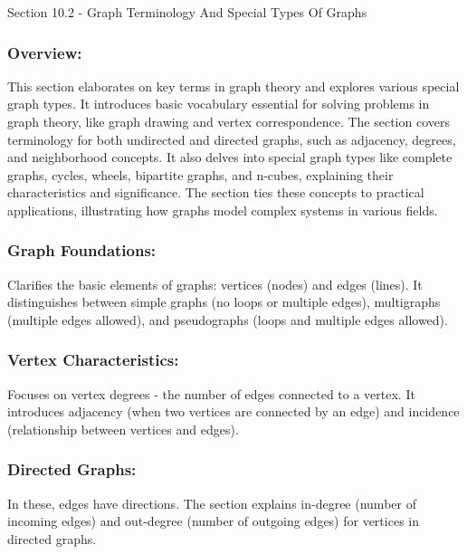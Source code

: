 \begin{notes}{Section 10.2 - Graph Terminology And Special Types Of Graphs}
    \subsubsection*{Overview:}

    This section elaborates on key terms in graph theory and explores various special graph types. It introduces basic vocabulary essential for solving problems in graph theory, like graph drawing and 
    vertex correspondence. The section covers terminology for both undirected and directed graphs, such as adjacency, degrees, and neighborhood concepts. It also delves into special graph types like 
    complete graphs, cycles, wheels, bipartite graphs, and n-cubes, explaining their characteristics and significance. The section ties these concepts to practical applications, illustrating how graphs 
    model complex systems in various fields. \vspace*{1em}

    \subsubsection*{Graph Foundations:}

    Clarifies the basic elements of graphs: vertices (nodes) and edges (lines). It distinguishes between simple graphs (no loops or multiple edges), multigraphs (multiple edges allowed), and pseudographs 
    (loops and multiple edges allowed). \vspace*{1em}

    \subsubsection*{Vertex Characteristics:}

    Focuses on vertex degrees - the number of edges connected to a vertex. It introduces adjacency (when two vertices are connected by an edge) and incidence (relationship between vertices and edges). \vspace*{1em}

    \subsubsection*{Directed Graphs:}

    In these, edges have directions. The section explains in-degree (number of incoming edges) and out-degree (number of outgoing edges) for vertices in directed graphs. \vspace*{1em}


\end{notes}
